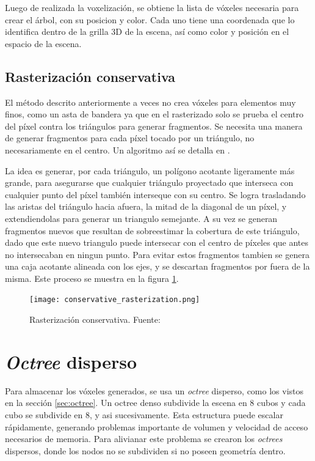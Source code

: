 Luego de realizada la voxelización, se obtiene la lista de vóxeles necesaria para crear el árbol, con su posicion y color.
Cada uno tiene una coordenada que lo identifica dentro de la grilla 3D de la escena, así como color y posición en el espacio de la escena.

\subsection{Rasterización conservativa}

El método descrito anteriormente a veces no crea vóxeles para elementos muy finos, como un asta de bandera ya que en el rasterizado solo se prueba el centro del píxel contra los triángulos para generar fragmentos. %
Se necesita una manera de generar fragmentos para cada píxel tocado por un triángulo, no necesariamente en el centro.
Un algoritmo así se detalla en \cite{conservative-rasterization}.

La idea es generar, por cada triángulo, un polígono acotante ligeramente más grande, para asegurarse que cualquier triángulo proyectado que interseca con cualquier punto del píxel también interseque con su centro.
Se logra trasladando las aristas del triángulo hacia afuera, la mitad de la diagonal de un píxel, y extendiendolas para generar un triangulo semejante.
A su vez se generan fragmentos nuevos que resultan de sobreestimar la cobertura de este triángulo, dado que este nuevo triangulo puede intersecar con el centro de píxeles que antes no intersecaban en ningun punto.
Para evitar estos fragmentos tambien se genera una caja acotante alineada con los ejes, y se descartan fragmentos por fuera de la misma.
Este proceso se muestra en la figura \ref{fig:conservative_rasterization}.

\begin{figure}[h!]
    \centering
    \texttt{[image: conservative\_rasterization.png]}
    \caption{Rasterización conservativa. Fuente: \cite{opengl-insights}}
    \label{fig:conservative_rasterization}
\end{figure}

\section{\textit{Octree} disperso}

Para almacenar los vóxeles generados, se usa un \textit{octree} disperso, como los vistos en la sección \ref{sec:octree}.
Un octree denso subdivide la escena en 8 cubos y cada cubo se subdivide en 8, y asi sucesivamente. Esta estructura puede escalar rápidamente, generando problemas importante de volumen y velocidad de acceso necesarios de memoria.
Para alivianar este problema se crearon los \textit{octrees} dispersos, donde los nodos no se subdividen si no poseen geometría dentro.

